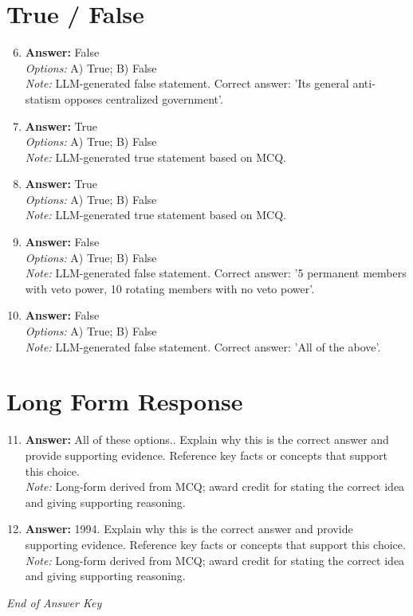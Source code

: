 \documentclass[12pt]{article}
\begin{document}
\section*{True / False}
\begin{enumerate}[label=\arabic*.]
\setcounter{enumi}{5}
\item \textbf{Answer:} False
\\ \textit{Options:} A) True; B) False
\\ \textit{Note:} LLM-generated false statement. Correct answer: 'Its general anti-statism opposes centralized government'.
\item \textbf{Answer:} True
\\ \textit{Options:} A) True; B) False
\\ \textit{Note:} LLM-generated true statement based on MCQ.
\item \textbf{Answer:} True
\\ \textit{Options:} A) True; B) False
\\ \textit{Note:} LLM-generated true statement based on MCQ.
\item \textbf{Answer:} False
\\ \textit{Options:} A) True; B) False
\\ \textit{Note:} LLM-generated false statement. Correct answer: '5 permanent members with veto power, 10 rotating members with no veto power'.
\item \textbf{Answer:} False
\\ \textit{Options:} A) True; B) False
\\ \textit{Note:} LLM-generated false statement. Correct answer: 'All of the above'.
\end{enumerate}

\section*{Long Form Response}
\begin{enumerate}[label=\arabic*.]
\setcounter{enumi}{10}
\item \textbf{Answer:} All of these options.. Explain why this is the correct answer and provide supporting evidence. Reference key facts or concepts that support this choice.
\\ \textit{Note:} Long-form derived from MCQ; award credit for stating the correct idea and giving supporting reasoning.
\item \textbf{Answer:} 1994. Explain why this is the correct answer and provide supporting evidence. Reference key facts or concepts that support this choice.
\\ \textit{Note:} Long-form derived from MCQ; award credit for stating the correct idea and giving supporting reasoning.
\end{enumerate}

\vfill
\noindent\textit{End of Answer Key}
\end{document}
